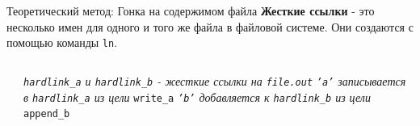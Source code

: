    \begin{frame}{Теоретический метод: Гонка на содержимом файла}
        \textbf{Жесткие ссылки} - это несколько имен для одного и того же файла в файловой системе. Они создаются с помощью команды \texttt{ln}.

        \begin{columns}[t]
            \begin{column}{.35 \textwidth}
                \newline
                
            \end{column}
            \begin{column}{.5 \textwidth}
                \newline \newline \newline \newline
                \textit{\texttt{hardlink\_a} и \texttt{hardlink\_b} - жесткие ссылки на \texttt{file.out}}
                \newline
                \newline
                \newline
                \textit{\texttt{'a'} записывается в \texttt{hardlink\_a} из цели}
                \newline
                \texttt{write\_a}
                \newline
                \newline
                \textit{\texttt{'b'} добавляется к \texttt{hardlink\_b} из цели}
                \newline
                \texttt{append\_b}
            \end{column}
        \end{columns}

    \end{frame}

